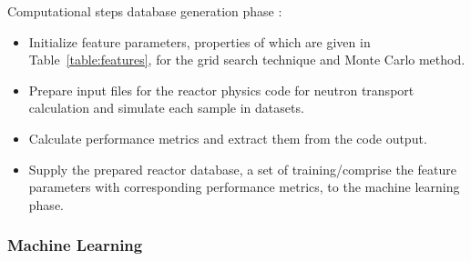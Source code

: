     Computational steps \DIFdelbegin {}\DIFdelend \DIFaddbegin {}\DIFaddend database generation phase \DIFaddbegin {}\DIFaddend :
    \begin{itemize}
        \item Initialize \DIFdelbegin {}\DIFdelend feature parameters, properties of which are given in Table~\ref{table:features}, for the grid search technique and Monte Carlo method.
        \item Prepare \DIFdelbegin {}\DIFdelend input files for the reactor physics code for neutron transport calculation and simulate each sample in \DIFdelbegin {}\DIFdelend \DIFaddbegin {}\DIFaddend datasets.
        \item Calculate \DIFdelbegin {}\DIFdelend performance metrics and extract them from the code output.
        \item Supply the prepared reactor database, a set of training/\DIFdelbegin {}\DIFdelend \DIFaddbegin {}\DIFaddend comprise the feature parameters with \DIFaddbegin {}\DIFaddend corresponding performance metrics, to the machine learning phase.
    \end{itemize}

\subsubsection{Machine Learning}

